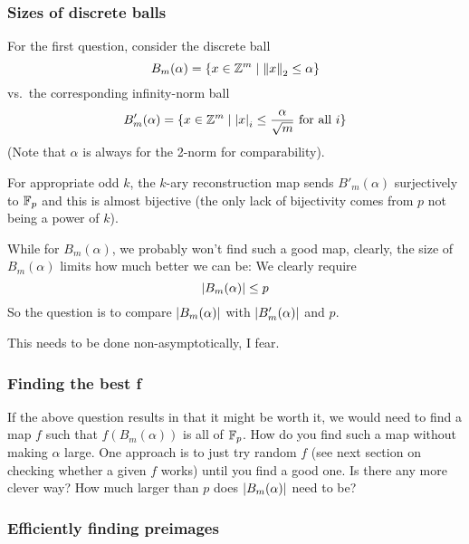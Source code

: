 \documentclass{article}
\begin{document}
\subsubsection{Sizes of discrete balls}
For the first question, consider the discrete ball
\[
 B_m(\alpha) = \{x \in {\mathbb{Z}}^m \mid {\lVert{x}\rVert}_2 \leq \alpha\}
\]
vs.\ the corresponding infinity-norm ball
\[
 B'_m(\alpha) = \{x \in {\mathbb{Z}}^m \mid {\lvert{x}\rvert}_i\leq \frac{\alpha}{\sqrt{m}}\ \text{for all}\ i \}
\]
(Note that $\alpha$ is always for the 2-norm for comparability).

For appropriate odd $k$, the $k$-ary reconstruction map sends $B'_m(\alpha)$ surjectively to ${\mathbb{F}}_p$ and this is almost bijective (the only lack of bijectivity comes from $p$ not being a power of $k$).

While for $B_m(\alpha)$, we probably won't find such a good map, clearly, the size of $B_m(\alpha)$ limits how much better we can be: We clearly require \[
{\lvert{B_m(\alpha)}\rvert} \leq p
\]
So the question is to compare ${\lvert{B_m(\alpha)}\rvert}$ with ${\lvert{B'_m(\alpha)}\rvert}$ and $p$.

This needs to be done non-asymptotically, I fear.
\subsubsection{Finding the best f}
If the above question results in that it might be worth it, we would need to find a map $f$ such that $f(B_m(\alpha))$ is all of ${\mathbb{F}}_p$. How do you find such a map without making $\alpha$ large.
One approach is to just try random $f$ (see next section on checking whether a given $f$ works) until you find a good one. Is there any more clever way? How much larger than $p$ does ${\lvert{B_m(\alpha)}\rvert}$ need to be?

\subsubsection{Efficiently finding preimages}
\end{document}

